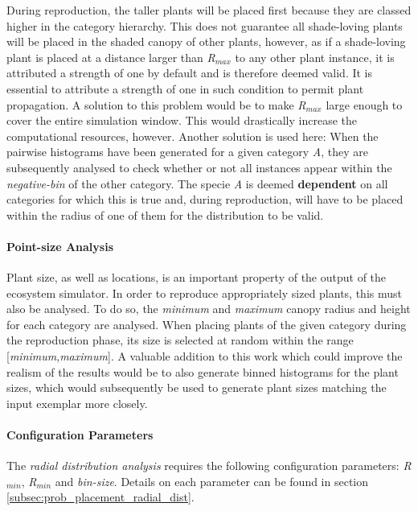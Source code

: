 During reproduction, the taller plants will be placed first because they are classed higher in the category hierarchy. This does not guarantee all shade-loving plants will be placed in the shaded canopy of other plants, however, as if a shade-loving plant is placed at a distance larger than \textit{R$_{max}$} to any other plant instance, it is attributed a strength of one by default and is therefore deemed valid. It is essential to attribute a strength of one in such condition to permit plant propagation. A solution to this problem would be to make \textit{R$_{max}$} large enough to cover the entire simulation window. This would drastically increase the computational resources, however. Another solution is used here: When the pairwise histograms have been generated for a given category \textit{A}, they are subsequently analysed to check whether or not all instances appear within the \textit{negative-bin} of the other category. The specie \textit{A} is deemed \textbf{dependent} on all categories for which this is true and, during reproduction, will have to be placed within the radius of one of them for the distribution to be valid.

\paragraph{Point-size Analysis}

Plant size, as well as locations, is an important property of the output of the ecosystem simulator. In order to reproduce appropriately sized plants, this must also be analysed. To do so, the \textit{minimum} and \textit{maximum} canopy radius and height for each category are analysed. When placing plants of the given category during the reproduction phase, its size is selected at random within the range [\textit{minimum},\textit{maximum}]. A valuable addition to this work which could improve the realism of the results would be to also generate binned histograms for the plant sizes, which would subsequently be used to generate plant sizes matching the input exemplar more closely.\\

\paragraph{Configuration Parameters}

The \textit{radial distribution analysis} requires the following configuration parameters: \textit{R$_{min}$}, \textit{R$_{min}$} and \textit{bin-size}. Details on each parameter can be found in section \ref{subsec:prob_placement_radial_dist}.\\

